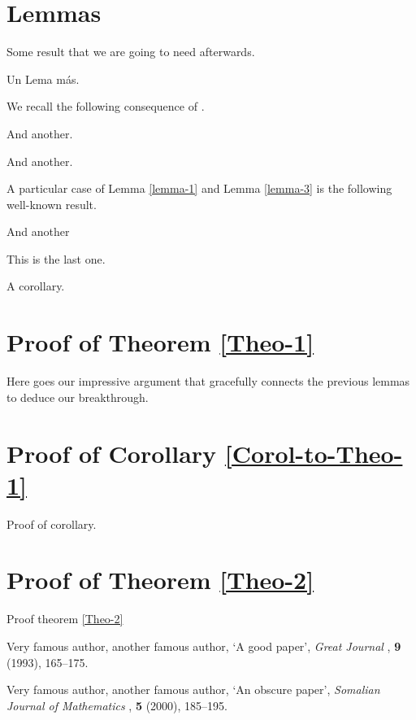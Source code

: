 \documentclass[12pt]{article}
\begin{document}
\section{Lemmas}
 
\begin{lemma}
\label{lemma-1} 
Some result that we are going to need afterwards. 
\end{lemma}

\medskip

\begin{lemma}
\label{lemma-2} 
Un Lema m\'as.
\end{lemma}

We recall the following consequence of \cite[Theorem 4.4]{Mig}.

\begin{lemma}
\label{lemma-3}
And another.
\end{lemma}

\begin{lemma}
\label{lemma-4}
And another.
\end{lemma}

A particular case of Lemma \ref{lemma-1} and Lemma \ref{lemma-3} is the following well-known
result.

\begin{lemma}
\label{lemma-5}
And another
\end{lemma}

\medskip

\begin{lemma}
\label{lemma-6}
This is the last one.
\end{lemma}

\begin{cor} \label{cor-to-lemma-6}
A corollary.
\end{cor}

\section{Proof of Theorem \ref{Theo-1}}
Here goes our impressive argument that gracefully connects the previous lemmas to deduce our breakthrough. 


\section{Proof of Corollary \ref{Corol-to-Theo-1} }
Proof of corollary.

\section{Proof of Theorem \ref{Theo-2}}
Proof theorem \ref{Theo-2}



\pagebreak
\begin{thebibliography}{99}

 Very famous author, another famous author, 
`A good paper', {\it Great Journal \/},
{\bf 9} (1993), 165--175.

 Very famous author, another famous author, 
`An obscure paper', {\it Somalian Journal of Mathematics \/},
{\bf 5} (2000), 185--195.

\end{thebibliography}
\end{document}
